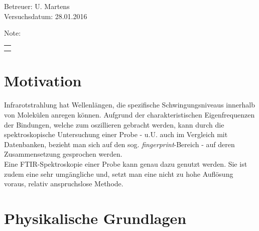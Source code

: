 \documentclass[a4paper,10pt,twocolumn]{article}
\title{\fett{\underline{Protokoll: FTIR-Spektroskopie}}} %
\author{Alexander Jankowski, Philipp Hacker}
\date{\today}
\newcommand{\tilt}[1]{\textit{#1}}
\begin{document}
	\renewcommand*{\equationautorefname}{Gl.}
	\renewcommand*{\figureautorefname}{Abb.}
	\renewcommand*{\tableautorefname}{Tab.}
	\renewcommand*{\sectionautorefname}{Abschn.}
	\renewcommand*{\subsectionautorefname}{Abschn.}
	\renewcommand*{\subsubsectionautorefname}{Abschn.}
	\renewcommand*{\figurename}{Abb. }
	\renewcommand*{\tablename}{Tab.}

	\renewcommand*{\figurename}{Abbildung }
	\renewcommand*{\tablename}{Tabelle}

	
	\onecolumn
	\maketitle

	\begin{center}
		Betreuer: U. Martens\\ %
		Versuchsdatum: 28.01.2016 \\ %
		\begin{table}[h]
			\centering
			Note: %
			\begin{tabularx}{1.5cm}{|X|}
				\hline \\ \\
				\hline
			\end{tabularx}
		\end{table}
	\end{center}


	\vspace*{\fill}
	\tableofcontents
	\vfill
	\clearpage
	
	\twocolumn

	\section{Motivation}

		Infrarotstrahlung hat Wellenl\"angen, die spezifische Schwingungsniveaus innerhalb von Molek\"ulen anregen k\"onnen. Aufgrund der charakteristischen Eigenfrequenzen der Bindungen, welche zum oszillieren gebracht werden, kann durch die spektroskopische Untersuchung einer Probe - u.U. auch im Vergleich mit  Datenbanken, bezieht man sich auf den sog. \tilt{fingerprint}-Bereich - auf deren Zusammensetzung gesprochen werden.\\
		Eine FTIR-Spektroskopie einer Probe kann genau dazu genutzt werden. Sie ist zudem eine sehr umg\"angliche und, setzt man eine nicht zu hohe Aufl\"osung voraus, relativ anspruchslose Methode.			
	\section{Physikalische Grundlagen}
\end{document}
